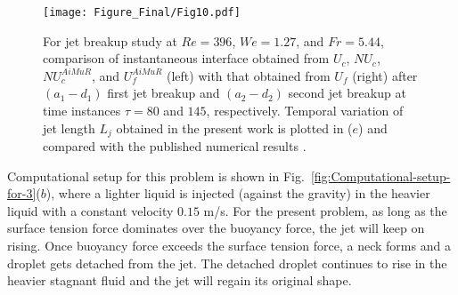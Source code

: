 \documentclass[preprint,12pt]{elsarticle}
\begin{document}
\begin{figure}
\begin{centering}

\par\end{centering}

\begin{centering}

\par\end{centering}

\begin{centering}
\texttt{[image: Figure\_Final/Fig10.pdf]}
\par\end{centering}




\protect\caption{\label{fig:Qualitative-and-quantitative-1}For jet breakup study at $Re=396$, $We=1.27$, and $Fr=5.44$, comparison of instantaneous interface obtained from $U_{c}$, $NU_{c}$, $NU_{c}^{AiMuR}$,
and $U_{f}^{AiMuR}$ (left) with that obtained from
$U_{f}$ (right) after $(a_{1}-d_{1})$ first jet breakup and $(a_{2}-d_{2})$ second jet breakup at time instances $\tau=80$ and $145$, respectively. Temporal variation
of jet length $L_j$ obtained in the present work is plotted in ($e$) and compared with the published numerical results \cite{lakdawala2014}.}
\end{figure}


Computational setup for this problem is shown in Fig.~\ref{fig:Computational-setup-for-3}($b$), where a lighter liquid is injected (against the gravity) in the heavier liquid with a constant velocity $0.15$  m/s. For the present problem, as long as the surface tension force dominates over the
buoyancy force, the jet will keep on rising. Once buoyancy force exceeds
the surface tension force, a neck forms and a droplet gets detached from the jet. The detached droplet continues to rise
in the heavier stagnant fluid and the jet will regain its original shape.
\end{document}
